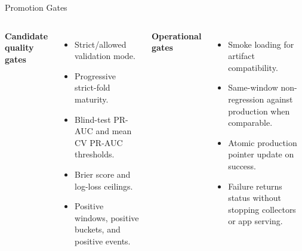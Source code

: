\documentclass[aspectratio=169]{beamer}
\begin{document}
\begin{frame}[shrink=4]{Promotion Gates}
\begin{columns}[T,onlytextwidth]
\textbf{Candidate quality gates}
\begin{itemize}
  \item Strict/allowed validation mode.
  \item Progressive strict-fold maturity.
  \item Blind-test PR-AUC and mean CV PR-AUC thresholds.
  \item Brier score and log-loss ceilings.
  \item Positive windows, positive buckets, and positive events.
\end{itemize}

\textbf{Operational gates}
\begin{itemize}
  \item Smoke loading for artifact compatibility.
  \item Same-window non-regression against production when comparable.
  \item Atomic production pointer update on success.
  \item Failure returns status without stopping collectors or app serving.
\end{itemize}
\end{columns}
\end{frame}
\end{document}
